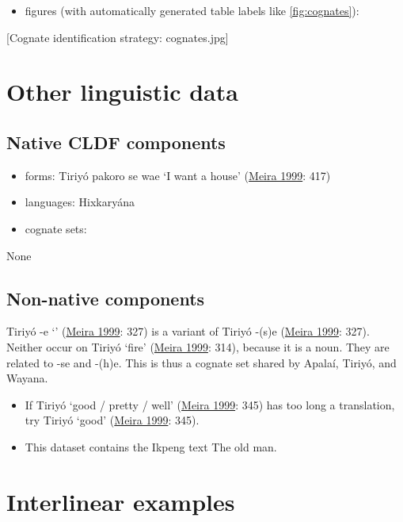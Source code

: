 \documentclass{article}
\begin{document}
\begin{itemize}
\tightlist
\item
  figures (with automatically generated table labels like
  \cref{fig:cognates}):
\end{itemize}

{[}Cognate identification strategy: cognates.jpg{]}

\section{\texorpdfstring{Other linguistic data
\label{sec:data}}{Other linguistic data }}

\subsection{Native CLDF components}

\begin{itemize}
\tightlist
\item
  forms: Tiriyó pakoro se wae `I want a house'
  (\protect\hyperlink{source-triomeira1999}{Meira 1999}: 417)
\item
  languages: Hixkaryána
\item
  cognate sets:
\end{itemize}

None

\subsection{Non-native components}

Tiriyó -e `' (\protect\hyperlink{source-triomeira1999}{Meira
1999}: 327) is a variant of Tiriyó -(s)e
(\protect\hyperlink{source-triomeira1999}{Meira 1999}: 327). Neither
occur on Tiriyó `fire' (\protect\hyperlink{source-triomeira1999}{Meira
1999}: 314), because it is a noun. They are related to -se and -(h)e.
This is thus a cognate set shared by Apalaí, Tiriyó, and Wayana.

\begin{itemize}
\item
  If Tiriyó `good / pretty / well'
  (\protect\hyperlink{source-triomeira1999}{Meira 1999}: 345) has too
  long a translation, try Tiriyó `good'
  (\protect\hyperlink{source-triomeira1999}{Meira 1999}: 345).
\item
  This dataset contains the Ikpeng text The old man.
\end{itemize}

\section{Interlinear examples}
\end{document}
